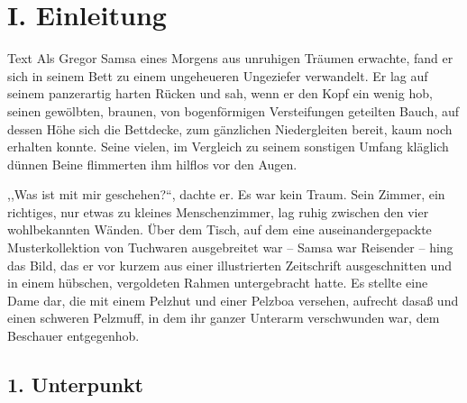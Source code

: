 

\printtitle

\section{I. Einleitung}

Text Als Gregor Samsa eines Morgens aus unruhigen Träumen erwachte, fand er sich in seinem Bett zu einem ungeheueren Ungeziefer verwandelt. Er lag auf seinem panzerartig harten Rücken und sah, wenn er den Kopf ein wenig hob, seinen gewölbten, braunen, von bogenförmigen Versteifungen geteilten Bauch, auf dessen Höhe sich die Bettdecke, zum gänzlichen Niedergleiten bereit, kaum noch erhalten konnte. Seine vielen, im Vergleich zu seinem sonstigen Umfang kläglich dünnen Beine flimmerten ihm hilflos vor den Augen.

,,Was ist mit mir geschehen?{}``, dachte er. Es war kein Traum. Sein Zimmer, ein richtiges, nur etwas zu kleines Menschenzimmer, lag ruhig zwischen den vier wohlbekannten Wänden. Über dem Tisch, auf dem eine auseinandergepackte Musterkollektion von Tuchwaren ausgebreitet war -- Samsa war Reisender -- hing das Bild, das er vor kurzem aus einer illustrierten Zeitschrift ausgeschnitten und in einem hübschen, vergoldeten Rahmen untergebracht hatte. Es stellte eine Dame dar, die mit einem Pelzhut und einer Pelzboa versehen, aufrecht dasaß und einen schweren Pelzmuff, in dem ihr ganzer Unterarm verschwunden war, dem Beschauer entgegenhob.

\subsection{1. Unterpunkt}

